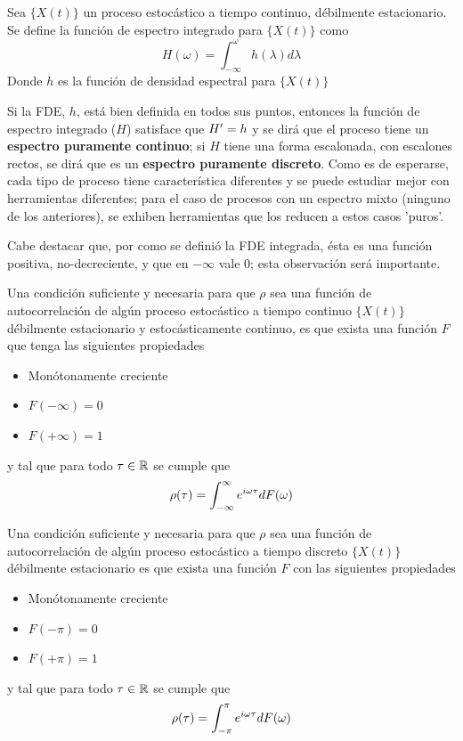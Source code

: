 \begin{definicion}
Sea $\{X(t)\}$ un proceso estoc\'astico a tiempo continuo, d\'ebilmente estacionario. Se define la 
funci\'on de espectro integrado para $\{X(t)\}$ como
\begin{equation*}
H(\omega) = \int_{-\infty}^{\omega} h(\lambda) d\lambda
\end{equation*}
Donde $h$ es la funci\'on de densidad espectral para $\{X(t)\}$
\label{FDE_integrado}
\end{definicion}

Si la FDE, $h$, est\'a bien definida en todos sus puntos, entonces la funci\'on de espectro 
integrado ($H$) satisface que $H^{\prime}= h$ y se dir\'a que el proceso tiene un \textbf{espectro 
puramente continuo}; si $H$ tiene una forma escalonada, con escalones rectos, se dir\'a que es un 
\textbf{espectro puramente discreto}.
Como es de esperarse, cada tipo de proceso tiene caracter\'istica diferentes y se puede estudiar 
mejor con herramientas diferentes; para el caso de procesos con un espectro mixto (ninguno de los 
anteriores), se exhiben herramientas que los reducen a estos casos 'puros'.

Cabe destacar que, por como se defini\'o la FDE integrada, \'esta es una funci\'on positiva, 
no-decreciente, y que en $-\infty$ vale 0; esta observaci\'on ser\'a importante.

\begin{teorema}
Una condici\'on suficiente y necesaria para que $\rho$ sea una funci\'on de autocorrelaci\'on de 
alg\'un proceso estoc\'astico a tiempo continuo $\{X(t)\}$ d\'ebilmente estacionario y 
estoc\'asticamente continuo, es que exista una funci\'on $F$ que tenga las siguientes propiedades
\begin{itemize}
\item Mon\'otonamente creciente
\item $F(-\infty) = 0$
\item $F(+\infty) = 1$
\end{itemize}
y tal que para todo $\tau \in \mathbb{R}$ se cumple que
\begin{equation*}
\rho(\tau) = \int_{-\infty}^{\infty} e^{i \omega \tau} dF(\omega)
\end{equation*}
\label{t_wienerkhinchin}
\end{teorema}

\begin{teorema}[Wold]
Una condici\'on suficiente y necesaria para que $\rho$ sea una funci\'on de autocorrelaci\'on de 
alg\'un proceso estoc\'astico a tiempo discreto $\{X(t)\}$ d\'ebilmente estacionario es que exista 
una funci\'on $F$ con las siguientes propiedades
\begin{itemize}
\item Mon\'otonamente creciente
\item $F(-\pi) = 0$
\item $F(+\pi) = 1$
\end{itemize}
y tal que para todo $\tau \in \mathbb{R}$ se cumple que
\begin{equation*}
\rho(\tau) = \int_{-\pi}^{\pi} e^{i \omega \tau} dF(\omega)
\end{equation*}
\label{t_wold}
\end{teorema}

